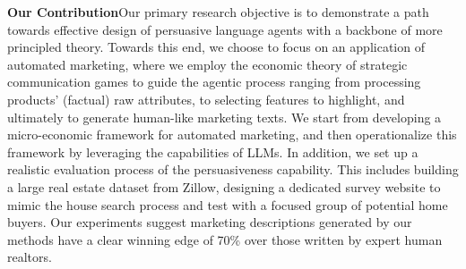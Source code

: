\textbf{Our Contribution}\quad  Our primary research objective is to demonstrate a path towards effective design of persuasive language agents with a backbone of more principled theory. Towards this end, we choose to focus on an application of automated marketing, where we employ the economic theory of strategic communication games to guide the agentic process ranging from processing products' (factual) raw attributes, to selecting features to highlight, and ultimately to generate human-like marketing texts. We start from developing a micro-economic framework for automated marketing, and then operationalize this framework  by leveraging the capabilities of LLMs. In addition, we set up a realistic evaluation process of the persuasiveness capability. 
This includes building a large real estate dataset from Zillow, designing a dedicated survey website to mimic the house search process and test with a focused group of potential home buyers. Our experiments suggest marketing descriptions generated by our methods have a clear winning edge of 70\% over those written by expert human realtors. 

